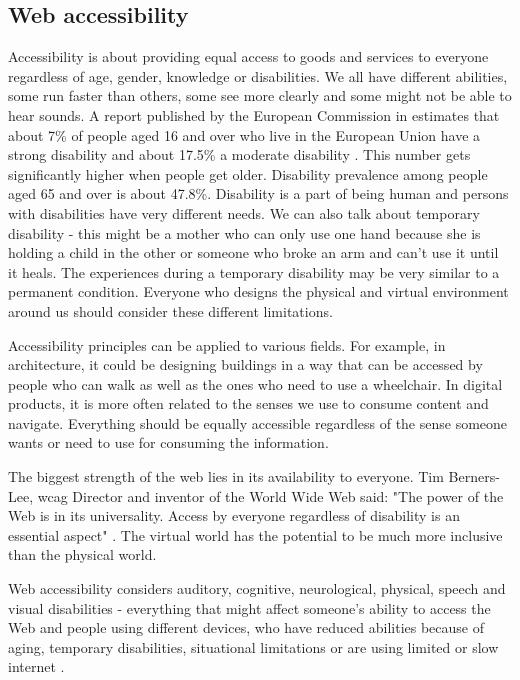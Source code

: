 \documentclass{master_thesis}
\begin{document}
\subsection{Web accessibility}

Accessibility is about providing equal access to goods and services to everyone regardless of age, gender, knowledge or disabilities. We all have different abilities, some run faster than others, some see more clearly and some might not be able to hear sounds. A report published by the European Commission in \citeyear{Grammenos2020} estimates that about 7\% of people aged 16 and over who live in the European Union have a strong disability and about 17.5\% a moderate disability \citep{Grammenos2020}. This number gets significantly higher when people get older. Disability prevalence among people aged 65 and over is about 47.8\%.  Disability is a part of being human and persons with disabilities have very different needs. We can also talk about temporary disability - this might be a mother who can only use one hand because she is holding a child in the other or someone who broke an arm and can't use it until it heals. The experiences during a temporary disability may be very similar to a permanent condition. Everyone who designs the physical and virtual environment around us should consider these different limitations.

Accessibility principles can be applied to various fields. For example, in architecture, it could be designing buildings in a way that can be accessed by people who can walk as well as the ones who need to use a wheelchair. In digital products, it is more often related to the senses we use to consume content and navigate. Everything should be equally accessible regardless of the sense someone wants or need to use for consuming the information.

The biggest strength of the web lies in its availability to everyone. Tim Berners-Lee, \ac{wcag} Director and inventor of the World Wide Web said: "The power of the Web is in its universality. Access by everyone regardless of disability is an essential aspect" \citep{WWWC1997}. The virtual world has the potential to be much more inclusive than the physical world.

Web accessibility considers auditory, cognitive, neurological, physical, speech and visual disabilities - everything that might affect someone's ability to access the Web and people using different devices, who have reduced abilities because of aging, temporary disabilities, situational limitations or are using limited or slow internet \citep{Henry2022}.
\end{document}
